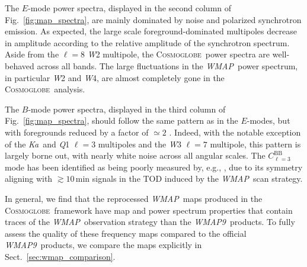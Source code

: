 \documentclass[twocolumn]{../../common/aa}
\def\WMAP{\emph{WMAP}}
\def\WMAPnine{\emph{WMAP9}}
\newcommand{\cosmoglobe}{\textsc{Cosmoglobe}}
\newcommand{\Ka}[0]{\textit{Ka}}
\newcommand{\Q}[0]{\textit Q}
\newcommand{\W}[0]{\textit W}
\begin{document}
The $E$-mode power spectra, displayed in the second column of Fig.~\ref{fig:map_spectra}, are mainly dominated by noise and polarized synchrotron emission. As expected, the large scale foreground-dominated multipoles decrease in amplitude according to the relative amplitude of the synchrotron spectrum. Aside from the $\ell=8$ \W2 multipole, the \cosmoglobe\ power spectra are well-behaved across all bands. The large fluctuations in the \WMAP\ power spectrum, in particular \W2 and \W4, are almost completely gone in the \cosmoglobe\ analysis.

The $B$-mode power spectra, displayed in the third column of Fig.~\ref{fig:map_spectra}, should follow the same pattern as in the $E$-modes, but with foregrounds reduced by a factor of $\simeq2$ \citep{bennett2012}. Indeed, with the notable exception of the \Ka\ and \Q1 $\ell=3$ multipoles and the \W3 $\ell=7$ multipole, this pattern is largely borne out, with nearly white noise across all angular scales. The $C_{\ell=3}^\mathrm{BB}$ mode has been identified as being poorly measured by, e.g., \citet{jarosik2010}, due to its symmetry aligning with $\gtrsim10\,\mathrm{min}$ signals in the TOD induced by the \WMAP\ scan strategy.

In general, we find that the reprocessed \WMAP\ maps produced in the \cosmoglobe\ framework have map and power spectrum properties that contain traces of the \WMAP\ observation strategy than the \WMAPnine\ products. To fully assess the quality of these frequency maps compared to the official \WMAPnine\ products, we compare the maps explicitly in Sect.~\ref{sec:wmap_comparison}.



\end{document}
